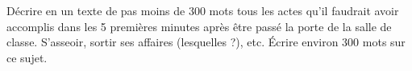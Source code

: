 
\begin{exercice}\label{exosmath-0426}

    Décrire en un texte de pas moins de 300 mots tous les actes qu'il faudrait avoir accomplis dans les 5 premières minutes après être passé la porte de la salle de classe. S'asseoir, sortir ses affaires (lesquelles ?), etc. Écrire environ 300 mots sur ce sujet.

\end{exercice}
